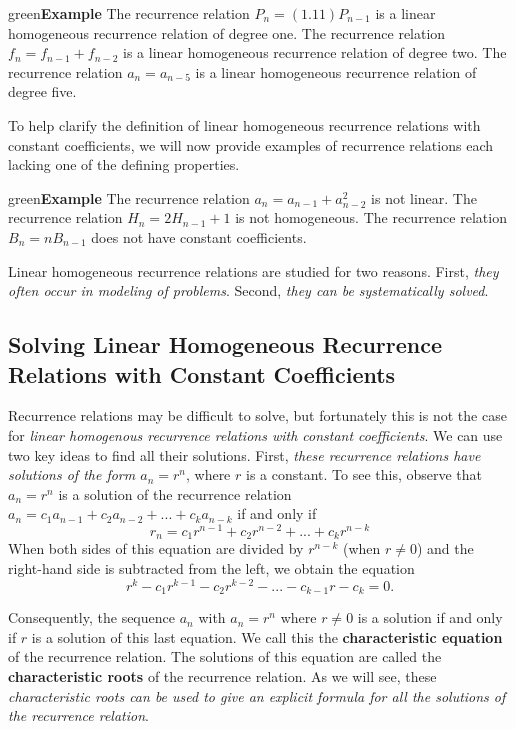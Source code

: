 \documentclass[11pt]{article}
\newenvironment{example}[1][\unskip]{\begin{mybox}{green}{\textbf{Example} {#1}}}{\end{mybox}}
\begin{document}
\begin{example}
The recurrence relation $P_n = (1.11) P_{n-1}$ is a linear homogeneous recurrence relation of degree one. The recurrence relation $f_n = f_{n-1} + f_{n-2}$ is a linear homogeneous recurrence relation of degree two. The recurrence relation $a_n = a_{n-5}$ is a linear homogeneous recurrence relation of degree five. 
\end{example}

To help clarify the definition of linear homogeneous recurrence relations with constant coefficients, we will now provide examples of recurrence relations each lacking one of the defining properties.

\begin{example}
The recurrence relation $a_n = a_{n-1} + a^2_{n-2}$ is not linear. The recurrence relation $H_n = 2H_{n-1} + 1$ is not homogeneous. The recurrence relation $B_n = nB_{n-1}$ does not have constant coefficients. 
\end{example}

Linear homogeneous recurrence relations are studied for two reasons. First, \textit{they often occur in modeling of problems}. Second, \textit{they can be systematically solved}.


\subsection{Solving Linear Homogeneous Recurrence Relations with Constant Coefficients}

Recurrence relations may be difficult to solve, but fortunately this is not the case for \textit{linear homogenous recurrence relations with constant coefficients}. We can use two key ideas to find all their solutions. 
First, \textit{these recurrence relations have solutions of the form $a_n = r^n$}, where
$r$ is a constant. To see this, observe that $a_n = r^n$ is a solution of the recurrence relation $a_n = c_1a_{n-1} + c_2a_{n-2} + ... + c_ka_{n-k}$ if and only if
\begin{equation*}
    r_n = c_1r^{n-1} + c_2r^{n-2} + ... + c_kr^{n-k}
\end{equation*}
When both sides of this equation are divided by $r^{n-k}$ (when $r \neq 0$) and the right-hand side is subtracted from the left, we obtain the equation
\begin{equation*}
    r^k - c_1r^{k-1} - c_2r^{k-2} - ... - c_{k-1}r - c_k = 0.
\end{equation*}

Consequently, the sequence ${a_n}$ with $a_n = r^n$ where $r \neq 0$ is a solution if and only if $r$ is a solution of this last equation. We call this the \textbf{characteristic equation} of the recurrence relation. The solutions of this equation are called the \textbf{characteristic roots} of the recurrence relation. As we will see, these \textit{characteristic roots can be used to give an explicit formula for all the solutions of the recurrence relation}.
\end{document}
